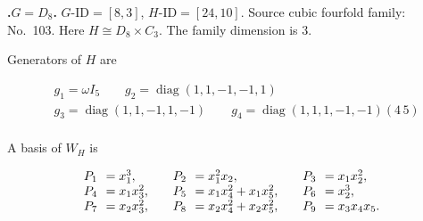 \documentclass[12pt]{amsart}
\makeatletter
\numberwithin{equation}{section}
\theoremstyle{plain}
\theoremstyle{definition}
\theoremstyle{remark}
\DeclareMathOperator{\diag}{diag}
\newcommand{\PBasisLabel}[1]{\mathrlap{P_{#1}}\phantom{P_{99}}}
\newenvironment{SecEightAlignedBasis}[1]{%
  \begingroup\renewcommand{\arraystretch}{1.18}%
  \[\begin{array}{@{}#1@{}}%
}{\end{array}\]\endgroup}
\newenvironment{familydisplay}{%
  \begingroup
  \setlength{\arraycolsep}{1.35pt}%
  \renewcommand{\arraystretch}{0.96}%
  \setlength{\jot}{2pt}%
}{\endgroup}
\makeatother
\begin{document}
\par{}\medskip\noindent\textbf{.\enspace $G=D_8$.}\label{fam:threefold-no-26}
$G\text{-ID}=[8,3]$, $H\text{-ID}=[24,10]$.
Source cubic fourfold family: No.~103.  Here
$H\cong D_8\times C_3$.
The family dimension is $3$.
\par\smallskip\noindent Generators of $H$ are\par\nopagebreak
\begin{familydisplay}
\begin{align*}
&g_{1}=\omega I_5
\qquad g_{2}=\diag(1,1,-1,-1,1)\\
&g_{3}=\diag(1,1,-1,1,-1)\qquad
g_{4}=\diag(1,1,1,-1,-1)(4\,5)\\
\end{align*}
\end{familydisplay}
\par\smallskip\noindent A basis of $W_H$ is\par\nopagebreak
\begin{familydisplay}
\begin{SecEightAlignedBasis}{l@{\qquad}l@{\qquad}l}
\PBasisLabel{1}=x_{1}^{3}, & \PBasisLabel{2}=x_{1}^{2}x_{2}, & \PBasisLabel{3}=x_{1}x_{2}^{2},\\
\PBasisLabel{4}=x_{1}x_{3}^{2}, & \PBasisLabel{5}=x_{1}x_{4}^{2}+x_{1}x_{5}^{2}, & \PBasisLabel{6}=x_{2}^{3},\\
\PBasisLabel{7}=x_{2}x_{3}^{2}, & \PBasisLabel{8}=x_{2}x_{4}^{2}+x_{2}x_{5}^{2}, & \PBasisLabel{9}=x_{3}x_{4}x_{5}.
\end{SecEightAlignedBasis}
\end{familydisplay}
\end{document}
